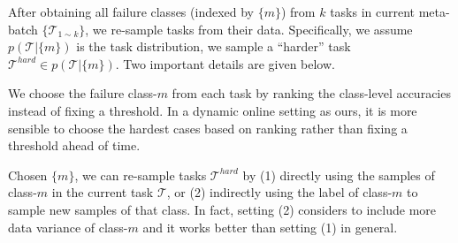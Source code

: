 %
%
After obtaining all failure classes (indexed by $\{m\}$) from $k$ tasks in current meta-batch $\{\mathcal{T}_{1\sim k}\}$, we re-sample tasks from their data. 
%
Specifically, we assume $p(\mathcal{T}|\{m\})$ is the task distribution, we sample a ``harder'' task $\mathcal{T}^{hard} \in p(\mathcal{T}|\{m\})$.
Two important details are given below.


%
 We choose the failure class-$m$ from each task by ranking the class-level accuracies instead of fixing a threshold.
%
In a dynamic online setting as ours, it is more sensible to choose the hardest cases based on ranking rather than fixing a threshold ahead of time. 
%

%
Chosen $\{m\}$, we can re-sample tasks $\mathcal{T}^{hard}$ by (1) directly using the samples of class-$m$ in the current task $\mathcal{T}$, or (2) indirectly using the label of class-$m$ to sample new samples of that class.
In fact, setting (2) considers to include more data variance of class-$m$ and it works better than setting (1) in general. 


